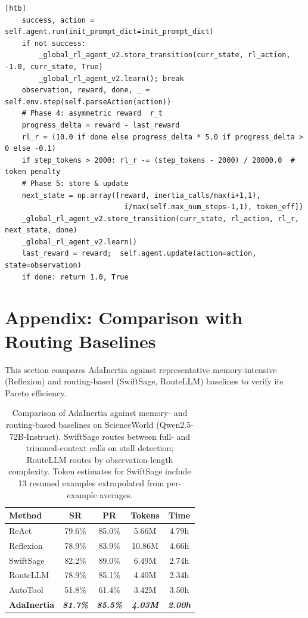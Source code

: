 \documentclass[runningheads]{llncs}
\begin{document}
\begin{lstlisting}[style=lncs,
  caption={AdaInertia core implementation (condensed).},
  label={lst:adainertia}][htb]
    success, action = self.agent.run(init_prompt_dict=init_prompt_dict)
    if not success:
        _global_rl_agent_v2.store_transition(curr_state, rl_action, -1.0, curr_state, True)
        _global_rl_agent_v2.learn(); break
    observation, reward, done, _ = self.env.step(self.parseAction(action))
    # Phase 4: asymmetric reward  r_t
    progress_delta = reward - last_reward
    rl_r = (10.0 if done else progress_delta * 5.0 if progress_delta > 0 else -0.1)
    if step_tokens > 2000: rl_r -= (step_tokens - 2000) / 20000.0  # token penalty
    # Phase 5: store & update
    next_state = np.array([reward, inertia_calls/max(i+1,1),
                            i/max(self.max_num_steps-1,1), token_eff])
    _global_rl_agent_v2.store_transition(curr_state, rl_action, rl_r, next_state, done)
    _global_rl_agent_v2.learn()
    last_reward = reward;  self.agent.update(action=action, state=observation)
    if done: return 1.0, True
\end{lstlisting}

\section{Appendix: Comparison with Routing Baselines}
\label{appendix:routing}

This section compares AdaInertia against representative memory-intensive (Reflexion) and routing-based (SwiftSage, RouteLLM) baselines to verify its Pareto efficiency.

\begin{table}[H]
    \centering
    \small
    \renewcommand{\arraystretch}{0.95}
    \vspace{-2mm}
    \caption{Comparison of AdaInertia against memory- and routing-based baselines on ScienceWorld (Qwen2.5-72B-Instruct). SwiftSage routes between full- and trimmed-context calls on stall detection; RouteLLM routes by observation-length complexity. Token estimates for SwiftSage include 13 resumed examples extrapolated from per-example averages.}
    \label{tab:routing_baselines}
    \vspace{-1mm}
    \setlength{\tabcolsep}{5pt}
    \begin{tabular}{lcccc}
    \toprule
    \textbf{Method} & \textbf{SR} & \textbf{PR} & \textbf{Tokens} & \textbf{Time} \\
    \midrule
    ReAct      & 79.6\% & 85.0\% & 5.66M  & 4.79h \\
    Reflexion  & 78.9\% & 83.9\% & 10.86M & 4.66h \\
    SwiftSage  & 82.2\% & 89.0\% & 6.49M  & 2.74h \\
    RouteLLM   & 78.9\% & 85.1\% & 4.40M  & 2.34h \\
    AutoTool   & 51.8\% & 61.4\% & 3.42M  & 3.50h \\
    \textbf{AdaInertia} & \textsl{\textbf{81.7\%}} & \textsl{\textbf{85.5\%}} & \textsl{\textbf{4.03M}} & \textsl{\textbf{2.00h}} \\
    \bottomrule
    \end{tabular}
    \vspace{-3mm}
\end{table}
\end{document}

